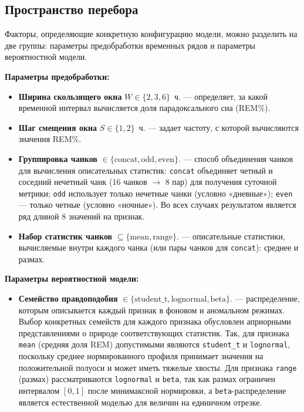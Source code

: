 \documentclass[14pt]{mmcs_article}
\begin{document}
	\subsection*{Пространство перебора}
	
	Факторы, определяющие конкретную конфигурацию модели, можно
	разделить на две группы: параметры предобработки временных
	рядов и параметры вероятностной модели.
	
	\textbf{Параметры предобработки:}
	\begin{itemize}
		\item \textbf{Ширина скользящего окна} $W \in \{2, 3, 6\}$~ч. —
		определяет, за какой временной интервал вычисляется доля
		парадоксального сна (REM\%).
		\item \textbf{Шаг смещения окна} $S \in \{1, 2\}$~ч. — 
		задает частоту, с которой вычисляются значения REM\%.
		\item \textbf{Группировка чанков}
		$\in \{\text{concat}, \text{odd}, \text{even}\}$. —
		способ объединения чанков для вычисления описательных
		статистик: \texttt{concat} объединяет четный и соседний
		нечетный чанк (16 чанков $\to$ 8 пар) для получения
		суточной метрики; \texttt{odd} использует только
		нечетные чанки (условно «дневные»); \texttt{even} —
		только четные (условно «ночные»). Во всех случаях
		результатом является ряд длиной 8 значений на признак.
		\item \textbf{Набор статистик чанков}
		$\subseteq \{\text{mean}, \text{range}\}$. —
		описательные статистики, вычисляемые внутри каждого чанка
		(или пары чанков для \texttt{concat}): среднее и размах.
	\end{itemize}
	
	\textbf{Параметры вероятностной модели:}
	\begin{itemize}
		\item \textbf{Семейство правдоподобия}
		$\in \{\text{student\_t}, \text{lognormal}, \text{beta}\}$. —
		распределение, которым описывается каждый признак в фоновом
		и аномальном режимах. Выбор конкретных семейств для каждого
		признака обусловлен априорными представлениями о природе
		соответствующих статистик. Так, для признака \texttt{mean}
		(средняя доля REM) допустимыми являются \texttt{student\_t}
		и \texttt{lognormal}, поскольку среднее нормированного
		профиля принимает значения на положительной полуоси и может
		иметь тяжелые хвосты. Для признака \texttt{range} (размах)
		рассматриваются \texttt{lognormal} и \texttt{beta}, так как
		размах ограничен интервалом $[0, 1]$ после минимаксной
		нормировки, а \texttt{beta}-распределение является
		естественной моделью для величин на единичном отрезке.
	\end{itemize}
	
\end{document}

